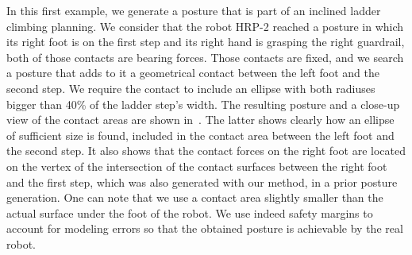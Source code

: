 In this first example, we generate a posture that is part of an inclined ladder climbing planning.
We consider that the robot HRP-2 reached a posture in which its right foot is on the first step and its right hand is grasping the right guardrail, both of those contacts are bearing forces.
Those contacts are fixed, and we search a posture that adds to it a geometrical contact between the left foot and the second step.
We require the contact to include an ellipse with both radiuses bigger than 40\% of the ladder step's width.
The resulting posture and a close-up view of the contact areas are shown in~. 
The latter shows clearly how an ellipse of sufficient size is found, included in the contact area between the left foot and the second step.
It also shows that the contact forces on the right foot are located on the vertex of the intersection of the contact surfaces between the right foot and the first step, which was also generated with our method, in a prior posture generation. One can note that we use a contact area slightly smaller than the actual surface under the foot of the robot. We use indeed safety margins to account for modeling errors so that the obtained posture is achievable by the real robot.
